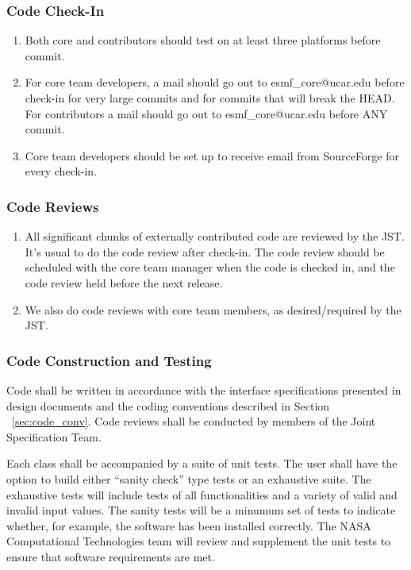\subsubsection{Code Check-In}
\begin{enumerate}
\item Both core and contributors should test on at least three platforms before commit.
\item For core team developers, a mail should go out to esmf\_core@ucar.edu
before check-in for very large commits and for commits that will break the
HEAD. For contributors a mail should go out to esmf\_core@ucar.edu before
ANY commit.
\item Core team developers should be set up to receive email from SourceForge
for every check-in.
\end{enumerate}

\subsubsection{Code Reviews}
\begin{enumerate}
\item All significant chunks of externally contributed code are reviewed by the JST. It's usual to do the code review after check-in. The code review should
be scheduled with the core team manager when the code is checked in, and
the code review held before the next release.
\item We also do code reviews with core team members, as desired/required
by the JST. 
\end{enumerate}

\subsubsection {Code Construction and Testing}

Code shall be written in accordance with the interface specifications
presented in design documents and the coding conventions described in 
Section ~\ref{sec:code_conv}.  Code reviews shall be conducted by members 
of the Joint Specification Team.

Each class shall be accompanied by a suite of unit tests.  The user
shall have the option to build either ``sanity check'' type tests or an 
exhaustive suite.  The exhaustive tests will include tests of all
functionalities and a variety of valid and invalid input values. The
sanity tests will be a minumum set of tests to indicate whether, for
example, the software has been installed correctly.  The NASA Computational 
Technologies team will review and supplement the unit tests to ensure 
that software requirements are met.

